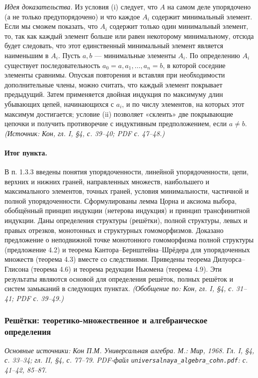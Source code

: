 \documentclass[a4paper,12pt]{article}
\begin{document}
\emph{Идея доказательства.} Из условия (i) следует, что \(A\) на самом деле упорядочено (а не только предупорядочено) и что каждое \(A_i\) содержит минимальный элемент. Если мы сможем показать, что \(A_i\) содержит только один минимальный элемент, то, так как каждый элемент больше или равен некоторому минимальному, отсюда будет следовать, что этот единственный минимальный элемент является наименьшим в \(A_i\). Пусть \(a,b\) — минимальные элементы \(A_i\). По определению \(A_i\) существует последовательность \(a_0=a,a_1,\ldots,a_n=b\), в которой соседние элементы сравнимы. Опуская повторения и вставляя при необходимости дополнительные члены, можно считать, что каждый элемент покрывает предыдущий. Затем применяется двойная индукция по максимуму длин убывающих цепей, начинающихся с \(a_i\), и по числу элементов, на которых этот максимум достигается; условие (ii) позволяет «склеить» две покрывающие цепочки и получить противоречие с индуктивным предположением, если \(a\ne b\).
\textit{(Источник: Кон, гл. I, §4, с. 39--40; PDF с. 47--48.)}

\paragraph{Итог пункта.}
В п. 1.3.3 введены понятия упорядоченности, линейной упорядоченности, цепи, верхних и нижних граней, направленных множеств, наибольшего и максимального элементов, точных граней, условия минимальности, частичной и полной упорядоченности. Сформулированы лемма Цорна и аксиома выбора, обобщённый принцип индукции (нетерова индукция) и принцип трансфинитной индукции. Даны определения структуры (решётки), полной структуры, левых и правых отрезков, монотонных и структурных гомоморфизмов. Доказано предложение о неподвижной точке монотонного гомоморфизма полной структуры (предложение 4.2) и теорема Кантора--Бернштейна--Шрёдера для упорядоченных множеств (теорема 4.3) вместе со следствиями. Приведены теорема Дилуорса--Глисона (теорема 4.6) и теорема редукции Ньюмена (теорема 4.9). Эти результаты являются основой для определения решёток, полных решёток и систем замыканий в следующих пунктах.
\textit{(Обобщение по: Кон, гл. I, §4, с. 31--41; PDF с. 39--49.)}

\subsubsection{Решётки: теоретико-множественное и алгебраическое определения}

\noindent\textit{Основные источники: Кон П.М. Универсальная алгебра. М.: Мир, 1968. Гл. I, §4, с. 33--34; гл. II, §4, с. 77--79. PDF-файл \texttt{universalnaya\_algebra\_cohn.pdf}: с. 41--42, 85--87.}
\end{document}
